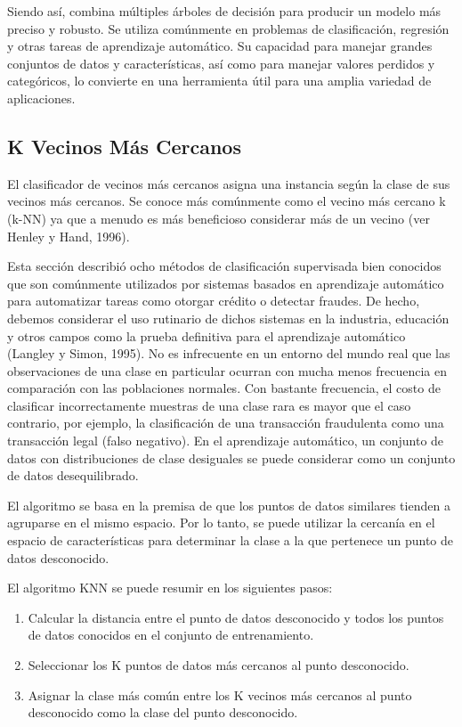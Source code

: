 \documentclass[a4paper,12pt]{article}
\begin{document}
Siendo así, combina múltiples árboles de decisión para producir un modelo más preciso y robusto. Se utiliza comúnmente en problemas de clasificación, regresión y otras tareas de aprendizaje automático. Su capacidad para manejar grandes conjuntos de datos y características, así como para manejar valores perdidos y categóricos, lo convierte en una herramienta útil para una amplia variedad de aplicaciones.

\subsection{K Vecinos Más Cercanos}

El clasificador de vecinos más cercanos asigna una instancia según la clase de sus vecinos más cercanos. Se conoce más comúnmente como el vecino más cercano k (k-NN) ya que a menudo es más beneficioso considerar más de un vecino (ver Henley y Hand, 1996).

Esta sección describió ocho métodos de clasificación supervisada bien conocidos que son comúnmente utilizados por sistemas basados en aprendizaje automático para automatizar tareas como otorgar crédito o detectar fraudes. De hecho, debemos considerar el uso rutinario de dichos sistemas en la industria, educación y otros campos como la prueba definitiva para el aprendizaje automático (Langley y Simon, 1995). No es infrecuente en un entorno del mundo real que las observaciones de una clase en particular ocurran con mucha menos frecuencia en comparación con las poblaciones normales. Con bastante frecuencia, el costo de clasificar incorrectamente muestras de una clase rara es mayor que el caso contrario, por ejemplo, la clasificación de una transacción fraudulenta como una transacción legal (falso negativo). En el aprendizaje automático, un conjunto de datos con distribuciones de clase desiguales se puede considerar como un conjunto de datos desequilibrado. 

El algoritmo se basa en la premisa de que los puntos de datos similares tienden a agruparse en el mismo espacio. Por lo tanto, se puede utilizar la cercanía en el espacio de características para determinar la clase a la que pertenece un punto de datos desconocido.

El algoritmo KNN se puede resumir en los siguientes pasos:

\begin{enumerate}
    \item Calcular la distancia entre el punto de datos desconocido y todos los puntos de datos conocidos en el conjunto de entrenamiento.
    \item Seleccionar los K puntos de datos más cercanos al punto desconocido.
    \item Asignar la clase más común entre los K vecinos más cercanos al punto desconocido como la clase del punto desconocido.
\end{enumerate}
\end{document}
